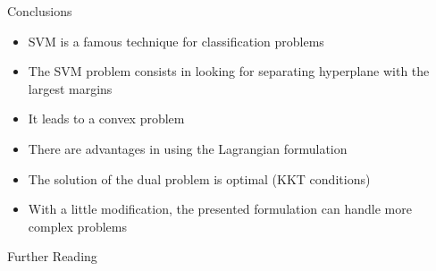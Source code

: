 \documentclass{beamer}
\begin{document}
\begin{frame}{Conclusions}
    \begin{itemize}
        \item SVM is a famous technique for classification problems
        \item The SVM problem consists in looking for separating hyperplane with the
            largest margins 
        \item It leads to a convex problem 
        \item There are advantages in using the Lagrangian formulation 
        \item The solution of the dual problem is optimal (KKT conditions)
        \item With a little modification, the presented formulation can handle more
            complex problems
    \end{itemize}
    
\end{frame}




\begin{frame}{Further Reading}
    
    
\end{frame}
\end{document}
